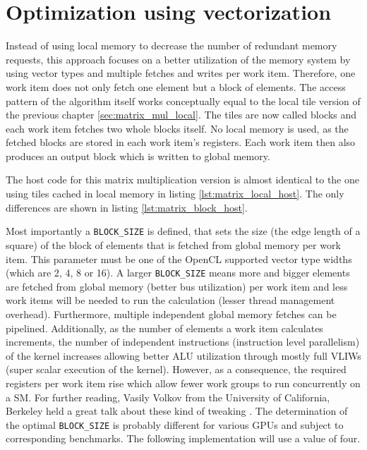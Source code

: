 \section{Optimization using vectorization}
\label{sec:matrix_mul_vec}
Instead of using local memory to decrease the number of redundant memory requests, this approach focuses on a better utilization of the memory system by using vector types and multiple fetches and writes per work item. Therefore, one work item does not only fetch one element but a block of elements.
The access pattern of the algorithm itself works conceptually equal to the local tile version of the previous chapter \ref{sec:matrix_mul_local}. The tiles are now called blocks and each work item fetches two whole blocks itself. No local memory is used, as the fetched blocks are stored in each work item's registers. Each work item then also produces an output block which is written to global memory.

The host code for this matrix multiplication version is almost identical to the one using tiles cached in local memory in listing \ref{lst:matrix_local_host}. The only differences are shown in listing \ref{lst:matrix_block_host}.



Most importantly a \lstinline!BLOCK_SIZE! is defined, that sets the size (the edge length of a square) of the block of elements that is fetched from global memory per work item. This parameter must be one of the OpenCL supported vector type widths (which are 2, 4, 8 or 16). A larger \lstinline!BLOCK_SIZE! means more and bigger elements are fetched from global memory (better bus utilization) per work item and less work items will be needed to run the calculation (lesser thread management overhead). Furthermore, multiple independent global memory fetches can be pipelined. Additionally, as the number of elements a work item calculates increments, the number of independent instructions (instruction level parallelism) of the kernel increases allowing better ALU utilization through mostly full VLIWs (super scalar execution of the kernel). However, as a consequence, the required registers per work item rise which allow fewer work groups to run concurrently on a SM. For further reading, Vasily Volkov from the University of California, Berkeley held a great talk about these kind of tweaking \cite{volkov}.
The determination of the optimal \lstinline!BLOCK_SIZE! is probably different for various GPUs and subject to corresponding benchmarks. The following implementation will use a value of four.
 
